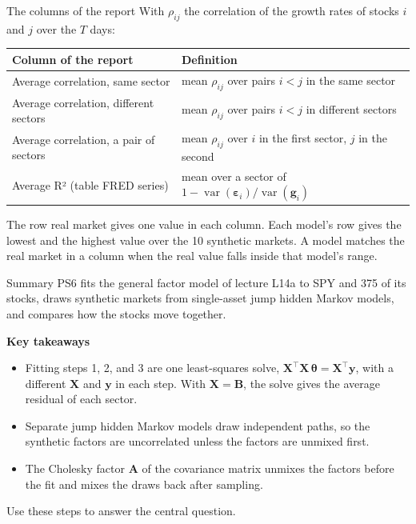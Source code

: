 \documentclass[aspectratio=169,11pt]{beamer}
\newcommand{\Bb}{\mathbf{B}}
\newcommand{\Ab}{\mathbf{A}}
\newcommand{\thetab}{\symbf{\theta}}
\newcommand{\epsb}{\symbf{\varepsilon}}
\newcommand{\gb}{\mathbf{g}}
\newcommand{\yb}{\mathbf{y}}
\newcommand{\Xb}{\mathbf{X}}
\begin{document}
\begin{frame}{The columns of the report}\label{fr:report}
With $\rho_{ij}$ the correlation of the growth rates of stocks $i$ and $j$ over
the $T$ days:
\vspace{0.3em}
\begin{center}\footnotesize
\begin{tabular}{ll}
\toprule
Column of the report & Definition \\
\midrule
Average correlation, same sector & mean $\rho_{ij}$ over pairs $i<j$ in the same sector \\
Average correlation, different sectors & mean $\rho_{ij}$ over pairs $i<j$ in different sectors \\
Average correlation, a pair of sectors & mean $\rho_{ij}$ over $i$ in the first sector, $j$ in the second \\
Average R² (table FRED series) & mean over a sector of $1-\operatorname{var}(\epsb_i)/\operatorname{var}(\gb_i)$ \\
\bottomrule
\end{tabular}
\end{center}
\vspace{0.3em}
The row real market gives one value in each column. Each model's row gives the
lowest and the highest value over the 10 synthetic markets. A model matches the
real market in a column when the real value falls inside that model's range.
\end{frame}

\begin{frame}{Summary}
PS6 fits the general factor model of lecture L14a to SPY and 375 of its
stocks, draws synthetic markets from single-asset jump hidden Markov models,
and compares how the stocks move together.

\vspace{0.6em}
\textbf{Key takeaways}
\begin{itemize}\setlength{\itemsep}{0.5em}
\item Fitting steps 1, 2, and 3 are one least-squares solve,
$\Xb^{\top}\Xb\,\thetab=\Xb^{\top}\yb$, with a different $\Xb$ and $\yb$ in each
step. With $\Xb=\Bb$, the solve gives the average residual of each sector.
\item Separate jump hidden Markov models draw independent paths, so the
synthetic factors are uncorrelated unless the factors are unmixed first.
\item The Cholesky factor $\Ab$ of the covariance matrix unmixes the factors
before the fit and mixes the draws back after sampling.
\end{itemize}
\vspace{0.6em}
Use these steps to answer the central question.
\end{frame}
\end{document}

